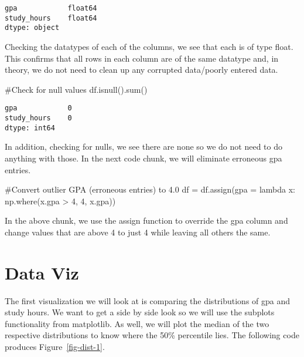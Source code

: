 \documentclass[
  letterpaper,
  DIV=11,
  numbers=noendperiod]{scrreprt}
\newenvironment{Shaded}{\begin{snugshade}}{\end{snugshade}}
\newcommand{\BuiltInTok}[1]{\textcolor[rgb]{0.00,0.23,0.31}{#1}}
\newcommand{\CommentTok}[1]{\textcolor[rgb]{0.37,0.37,0.37}{#1}}
\newcommand{\DecValTok}[1]{\textcolor[rgb]{0.68,0.00,0.00}{#1}}
\newcommand{\KeywordTok}[1]{\textcolor[rgb]{0.00,0.23,0.31}{#1}}
\newcommand{\NormalTok}[1]{\textcolor[rgb]{0.00,0.23,0.31}{#1}}
\newcommand{\OperatorTok}[1]{\textcolor[rgb]{0.37,0.37,0.37}{#1}}
\begin{document}
\begin{verbatim}
gpa            float64
study_hours    float64
dtype: object
\end{verbatim}

Checking the datatypes of each of the columns, we see that each is of
type float. This confirms that all rows in each column are of the same
datatype and, in theory, we do not need to clean up any corrupted
data/poorly entered data.

\begin{Shaded}
\begin{Highlighting}[]
\CommentTok{\#Check for null values}
\NormalTok{df.isnull().}\BuiltInTok{sum}\NormalTok{()}
\end{Highlighting}
\end{Shaded}

\begin{verbatim}
gpa            0
study_hours    0
dtype: int64
\end{verbatim}

In addition, checking for nulls, we see there are none so we do not need
to do anything with those. In the next code chunk, we will eliminate
erroneous gpa entries.

\begin{Shaded}
\begin{Highlighting}[]
\CommentTok{\#Convert outlier GPA (erroneous entries) to 4.0}
\NormalTok{df }\OperatorTok{=}\NormalTok{ df.assign(gpa }\OperatorTok{=} \KeywordTok{lambda}\NormalTok{ x: np.where(x.gpa }\OperatorTok{\textgreater{}} \DecValTok{4}\NormalTok{, }\DecValTok{4}\NormalTok{, x.gpa))}
\end{Highlighting}
\end{Shaded}

In the above chunk, we use the assign function to override the gpa
column and change values that are above 4 to just 4 while leaving all
others the same.

\hypertarget{data-viz}{%
\section{Data Viz}\label{data-viz}}

The first visualization we will look at is comparing the distributions
of gpa and study hours. We want to get a side by side look so we will
use the subplots functionality from matplotlib. As well, we will plot
the median of the two respective distributions to know where the 50\%
percentile lies. The following code produces Figure~\ref{fig-dist-1}.
\end{document}
